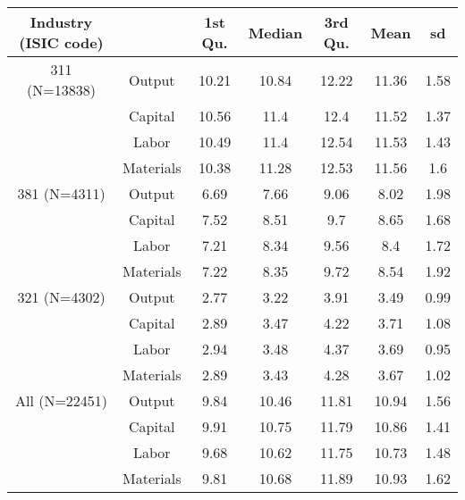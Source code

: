 \begin{table}[H]
\centering
\begin{tabular}{ccccccc}
  \hline\hline Industry (ISIC code) &   & 1st Qu. & Median & 3rd Qu. & Mean & sd \\ 
  \hline
311 (N=13838) & Output & 10.21 & 10.84 & 12.22 & 11.36 & 1.58 \\ 
   & Capital & 10.56 & 11.4 & 12.4 & 11.52 & 1.37 \\ 
   & Labor & 10.49 & 11.4 & 12.54 & 11.53 & 1.43 \\ 
   & Materials & 10.38 & 11.28 & 12.53 & 11.56 & 1.6 \\ 
  381 (N=4311) & Output & 6.69 & 7.66 & 9.06 & 8.02 & 1.98 \\ 
   & Capital & 7.52 & 8.51 & 9.7 & 8.65 & 1.68 \\ 
   & Labor & 7.21 & 8.34 & 9.56 & 8.4 & 1.72 \\ 
   & Materials & 7.22 & 8.35 & 9.72 & 8.54 & 1.92 \\ 
  321 (N=4302) & Output & 2.77 & 3.22 & 3.91 & 3.49 & 0.99 \\ 
   & Capital & 2.89 & 3.47 & 4.22 & 3.71 & 1.08 \\ 
   & Labor & 2.94 & 3.48 & 4.37 & 3.69 & 0.95 \\ 
   & Materials & 2.89 & 3.43 & 4.28 & 3.67 & 1.02 \\ 
  All (N=22451) & Output & 9.84 & 10.46 & 11.81 & 10.94 & 1.56 \\ 
   & Capital & 9.91 & 10.75 & 11.79 & 10.86 & 1.41 \\ 
   & Labor & 9.68 & 10.62 & 11.75 & 10.73 & 1.48 \\ 
   & Materials & 9.81 & 10.68 & 11.89 & 10.93 & 1.62 \\ 
   \hline
\end{tabular}
\end{table}
